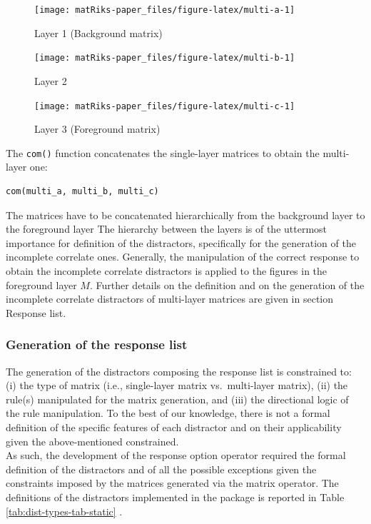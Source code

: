 \begin{figure}
\texttt{[image: matRiks-paper\_files/figure-latex/multi-a-1]} \caption{Layer 1 (Background matrix)}\label{fig:multi-a}
\end{figure}

\begin{figure}
\texttt{[image: matRiks-paper\_files/figure-latex/multi-b-1]} \caption{Layer 2}\label{fig:multi-b}
\end{figure}

\begin{figure}
\texttt{[image: matRiks-paper\_files/figure-latex/multi-c-1]} \caption{Layer 3 (Foreground matrix)}\label{fig:multi-c}
\end{figure}

The \texttt{com()} function concatenates the single-layer matrices to obtain the multi-layer one:

\begin{verbatim}
com(multi_a, multi_b, multi_c)
\end{verbatim}

The matrices have to be concatenated hierarchically from the background layer to the foreground layer The hierarchy between the layers is of the uttermost importance for definition of the distractors, specifically for the generation of the incomplete correlate ones.
Generally, the manipulation of the correct response to obtain the incomplete correlate distractors is applied to the figures in the foreground layer \(M\).
Further details on the definition and on the generation of the incomplete correlate distractors of multi-layer matrices are given in section Response list.

\subsubsection{Generation of the response list}\label{generation-of-the-response-list}

The generation of the distractors composing the response list is constrained to: (i) the type of matrix (i.e., single-layer matrix vs.~multi-layer matrix), (ii) the rule(s) manipulated for the matrix generation, and (iii) the directional logic of the rule manipulation.
To the best of our knowledge, there is not a formal definition of the specific features of each distractor and on their applicability given the above-mentioned constrained.\\
As such, the development of the response option operator required the formal definition of the distractors and of all the possible exceptions given the constraints imposed by the matrices generated via the matrix operator.
The definitions of the distractors implemented in the  package is reported in Table \ref{tab:dist-types-tab-static} .

